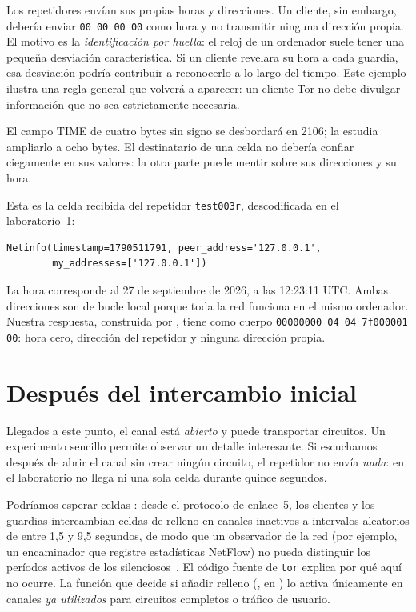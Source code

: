 \begin{attenzione}
Los repetidores envían sus propias horas y direcciones. Un cliente, sin embargo, debería enviar \texttt{00 00 00 00} como hora y no transmitir ninguna dirección propia. El motivo es la \emph{identificación por huella}: el reloj de un ordenador suele tener una pequeña desviación característica. Si un cliente revelara su hora a cada guardia, esa desviación podría contribuir a reconocerlo a lo largo del tiempo. Este ejemplo ilustra una regla general que volverá a aparecer: un cliente Tor no debe divulgar información que no sea estrictamente necesaria.
\end{attenzione}

El campo TIME de cuatro bytes sin signo se desbordará en 2106; la  estudia ampliarlo a ocho bytes. El destinatario de una celda  no debería confiar ciegamente en sus valores: la otra parte puede mentir sobre sus direcciones y su hora.

Esta es la celda  recibida del repetidor \texttt{test003r}, descodificada en el laboratorio~1:

\begin{lstlisting}[numbers=none]
Netinfo(timestamp=1790511791, peer_address='127.0.0.1',
        my_addresses=['127.0.0.1'])
\end{lstlisting}

La hora corresponde al 27 de septiembre de 2026, a las 12:23:11 UTC. Ambas direcciones son de bucle local porque toda la red funciona en el mismo ordenador. Nuestra respuesta, construida por , tiene como cuerpo \texttt{00000000 04 04 7f000001 00}: hora cero, dirección del repetidor y ninguna dirección propia.

\section{Después del intercambio inicial}\label{sec:canale-dopo}

Llegados a este punto, el canal está \emph{abierto} y puede transportar circuitos. Un experimento sencillo permite observar un detalle interesante. Si escuchamos después de abrir el canal sin crear ningún circuito, el repetidor no envía \emph{nada}: en el laboratorio no llega ni una sola celda durante quince segundos.

Podríamos esperar celdas : desde el protocolo de enlace~5, los clientes y los guardias intercambian celdas de relleno en canales inactivos a intervalos aleatorios de entre 1,5 y 9,5 segundos, de modo que un observador de la red (por ejemplo, un encaminador que registre estadísticas NetFlow) no pueda distinguir los períodos activos de los silenciosos~. El código fuente de \texttt{tor} explica por qué aquí no ocurre. La función que decide si añadir relleno (, en ) lo activa únicamente en canales \emph{ya utilizados} para circuitos completos o tráfico de usuario.

